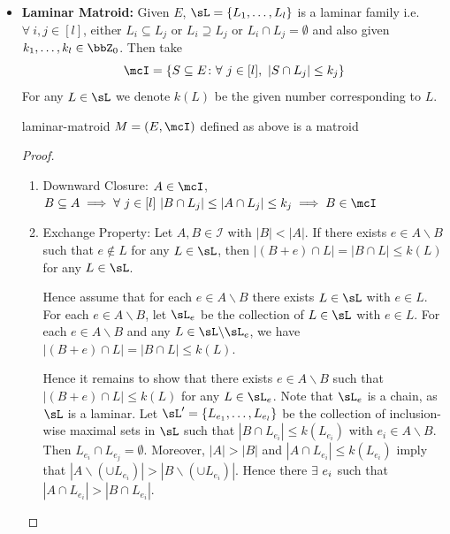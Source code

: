 \begin{itemize}[label=$\bullet$]
\begin{proof}
\begin{enumerate}[label=\bfseries\tiny\protect\circled{\small\arabic*}]
	\end{enumerate}Therefore $M$ is a matroid
\end{proof}
\item \textbf{Laminar Matroid:} Given $E$, $\sL=\{L_1,\dots,L_l\}$ is a laminar family i.e. $\forall\ i,j\in [l]$, either $L_i\subseteq L_j$ or $L_i\supseteq L_j$ or $L_i\cap L_j=\emptyset$ and also given $k_1,\dots, k_l\in \bbZ_0$. Then take $$\mcI=\{S\subseteq E\colon \forall \ j\in[l],\ |S\cap L_j|\leq k_j\}$$For any $L\in\sL$ we denote $k(L)$ be the given number corresponding to $L$.
\begin{lemma}{}{laminar-matroid}
	$M=(E,\mcI)$ defined as above is a matroid
\end{lemma}
\begin{proof}
	\begin{enumerate}[label=\bfseries\tiny\protect\circled{\small\arabic*}]
		\item Downward Closure: $A\in \mcI$, $B\subseteq A\implies \forall\ j\in[l]\ |B\cap L_j|\leq |A\cap L_j|\leq k_j\implies B\in \mcI$
		\item Exchange Property: \parinn Let $A,B\in \mathcal{I}$ with $|B|<|A|$.	If there exists $e\in A\backslash B$ such that $e\notin L$ for any $L\in\sL$, then $|(B+e)\cap L|=|B\cap L|\leq k(L)$ for any $L\in\sL$.
		
		Hence assume that for each $e\in A\backslash B$ there exists $L\in\sL$ with $e\in L$.
		For each $e\in A\backslash B$, let $\sL_e$ be the collection of $L\in\sL$ with $e\in L$.
		For each $e\in A\backslash B$ and any $L\in\sL\backslash\sL_e$, we have $|(B+e)\cap L|=|B\cap L|\leq k(L)$.
		
		Hence it remains to show that there exists $e\in A\backslash B$ such that $|(B+e)\cap L|\leq k(L)$ for any $L\in\sL_e$.
		Note that $\sL_e$ is a chain, as $\sL$ is a laminar.
		Let $\sL'=\{L_{e_1},\ldots,L_{e_l}\}$ be the collection of inclusion-wise maximal sets in $\sL$ such that $|B\cap L_{e_i}|\leq k(L_{e_i})$ with $e_i\in A\backslash B$.
		Then $L_{e_i}\cap L_{e_j}=\emptyset$. Moreover, $|A|>|B|$ and $|A\cap L_{e_i}|\leq k(L_{e_i})$ imply that $|A\backslash (\cup L_{e_i})|>|B\backslash (\cup L_{e_i})|$. Hence there $\exists\ e_i$ such that $|A\cap L_{e_i}|>|B\cap L_{e_i}|$.
		

\end{enumerate}
\end{proof}
\end{itemize}
